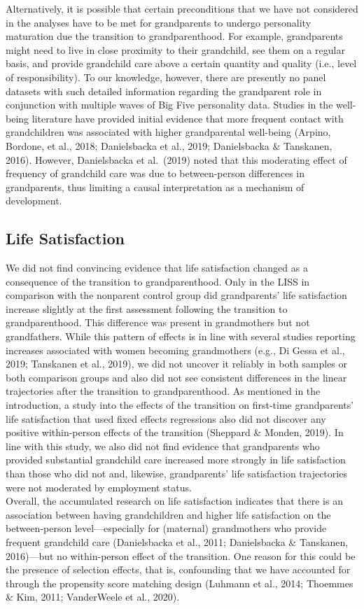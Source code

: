 \documentclass[
  english,
  man, noextraspace]{apa7}
\begin{document}
Alternatively, it is possible that certain preconditions that we have not considered in the analyses have to be met for grandparents to undergo personality maturation due the transition to grandparenthood. For example, grandparents might need to live in close proximity to their grandchild, see them on a regular basis, and provide grandchild care above a certain quantity and quality (i.e., level of responsibility). To our knowledge, however, there are presently no panel datasets with such detailed information regarding the grandparent role in conjunction with multiple waves of Big Five personality data. Studies in the well-being literature have provided initial evidence that more frequent contact with grandchildren was associated with higher grandparental well-being (Arpino, Bordone, et al., 2018; Danielsbacka et al., 2019; Danielsbacka \& Tanskanen, 2016). However, Danielsbacka et al.~(2019) noted that this moderating effect of frequency of grandchild care was due to between-person differences in grandparents, thus limiting a causal interpretation as a mechanism of development.

\hypertarget{life-satisfaction-2}{%
\subsection{Life Satisfaction}\label{life-satisfaction-2}}

We did not find convincing evidence that life satisfaction changed as a consequence of the transition to grandparenthood. Only in the LISS in comparison with the nonparent control group did grandparents' life satisfaction increase slightly at the first assessment following the transition to grandparenthood. This difference was present in grandmothers but not grandfathers. While this pattern of effects is in line with several studies reporting increases associated with women becoming grandmothers (e.g., Di Gessa et al., 2019; Tanskanen et al., 2019), we did not uncover it reliably in both samples or both comparison groups and also did not see consistent differences in the linear trajectories after the transition to grandparenthood. As mentioned in the introduction, a study into the effects of the transition on first-time grandparents' life satisfaction that used fixed effects regressions also did not discover any positive within-person effects of the transition (Sheppard \& Monden, 2019). In line with this study, we also did not find evidence that grandparents who provided substantial grandchild care increased more strongly in life satisfaction than those who did not and, likewise, grandparents' life satisfaction trajectories were not moderated by employment status.\\
Overall, the accumulated research on life satisfaction indicates that there is an association between having grandchildren and higher life satisfaction on the between-person level---especially for (maternal) grandmothers who provide frequent grandchild care (Danielsbacka et al., 2011; Danielsbacka \& Tanskanen, 2016)---but no within-person effect of the transition. One reason for this could be the presence of selection effects, that is, confounding that we have accounted for through the propensity score matching design (Luhmann et al., 2014; Thoemmes \& Kim, 2011; VanderWeele et al., 2020).
\end{document}
